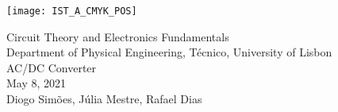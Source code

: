 
\thispagestyle {empty}

\texttt{[image: IST\_A\_CMYK\_POS]}

\begin{center}
%
\vspace{1.0cm}

\vspace{1cm}
{\FontLb Circuit Theory and Electronics Fundamentals} \\ %
\vspace{1cm}
{\FontSn Department of Physical Engineering, Técnico, University of Lisbon} \\ %
\vspace{1cm}
{\FontSn AC/DC Converter } \\
\vspace{1cm}
{\FontSn May 8, 2021} \\ %
{\FontSn Diogo Simões, Júlia Mestre, Rafael Dias}
\end{center}

